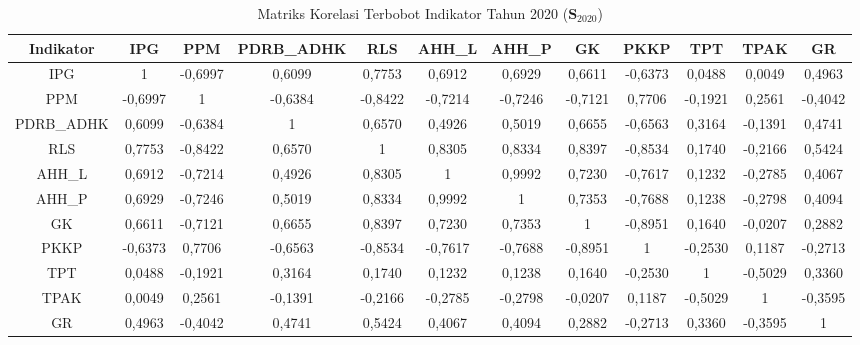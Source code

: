 \begin{table}[H]
\centering
\caption{Matriks Korelasi Terbobot Indikator Tahun 2020 ($\mathbf{S}_{2020}$)} \label{tab:app2matriks_intra_loading_2020}
\begin{adjustbox}{max width=\textwidth, max height=0.85\textheight}
\begin{tabular}{|c|c|c|c|c|c|c|c|c|c|c|c|}
\hline
\textbf{Indikator} & \textbf{IPG} & \textbf{PPM} & \textbf{PDRB\_ADHK} & \textbf{RLS} & \textbf{AHH\_L} & \textbf{AHH\_P} & \textbf{GK} & \textbf{PKKP} & \textbf{TPT} & \textbf{TPAK} & \textbf{GR} \\
\hline
IPG & 1 & -0,6997 & 0,6099 & 0,7753 & 0,6912 & 0,6929 & 0,6611 & -0,6373 & 0,0488 & 0,0049 & 0,4963 \\
PPM & -0,6997 & 1 & -0,6384 & -0,8422 & -0,7214 & -0,7246 & -0,7121 & 0,7706 & -0,1921 & 0,2561 & -0,4042 \\
PDRB\_ADHK & 0,6099 & -0,6384 & 1 & 0,6570 & 0,4926 & 0,5019 & 0,6655 & -0,6563 & 0,3164 & -0,1391 & 0,4741 \\
RLS & 0,7753 & -0,8422 & 0,6570 & 1 & 0,8305 & 0,8334 & 0,8397 & -0,8534 & 0,1740 & -0,2166 & 0,5424 \\
AHH\_L & 0,6912 & -0,7214 & 0,4926 & 0,8305 & 1 & 0,9992 & 0,7230 & -0,7617 & 0,1232 & -0,2785 & 0,4067 \\
AHH\_P & 0,6929 & -0,7246 & 0,5019 & 0,8334 & 0,9992 & 1 & 0,7353 & -0,7688 & 0,1238 & -0,2798 & 0,4094 \\
GK & 0,6611 & -0,7121 & 0,6655 & 0,8397 & 0,7230 & 0,7353 & 1 & -0,8951 & 0,1640 & -0,0207 & 0,2882 \\
PKKP & -0,6373 & 0,7706 & -0,6563 & -0,8534 & -0,7617 & -0,7688 & -0,8951 & 1 & -0,2530 & 0,1187 & -0,2713 \\
TPT & 0,0488 & -0,1921 & 0,3164 & 0,1740 & 0,1232 & 0,1238 & 0,1640 & -0,2530 & 1 & -0,5029 & 0,3360 \\
TPAK & 0,0049 & 0,2561 & -0,1391 & -0,2166 & -0,2785 & -0,2798 & -0,0207 & 0,1187 & -0,5029 & 1 & -0,3595 \\
GR & 0,4963 & -0,4042 & 0,4741 & 0,5424 & 0,4067 & 0,4094 & 0,2882 & -0,2713 & 0,3360 & -0,3595 & 1 \\
\hline
\end{tabular}
\end{adjustbox}
\end{table}